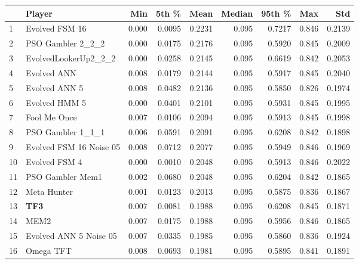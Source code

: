 \begin{tabular}{llrrrrrrr}
\toprule
{} &                   Player &    Min &   5th \% &    Mean &  Median &  95th \% &    Max &     Std \\
\midrule
1  &           Evolved FSM 16 &  0.000 &  0.0095 &  0.2231 &   0.095 &  0.7217 &  0.846 &  0.2139 \\
2  &        PSO Gambler 2\_2\_2 &  0.000 &  0.0175 &  0.2176 &   0.095 &  0.5920 &  0.845 &  0.2009 \\
3  &     EvolvedLookerUp2\_2\_2 &  0.000 &  0.0258 &  0.2145 &   0.095 &  0.6619 &  0.842 &  0.2053 \\
4  &              Evolved ANN &  0.008 &  0.0179 &  0.2144 &   0.095 &  0.5917 &  0.845 &  0.2040 \\
5  &            Evolved ANN 5 &  0.008 &  0.0482 &  0.2136 &   0.095 &  0.5850 &  0.826 &  0.1974 \\
6  &            Evolved HMM 5 &  0.000 &  0.0401 &  0.2101 &   0.095 &  0.5931 &  0.845 &  0.1995 \\
7  &             Fool Me Once &  0.007 &  0.0106 &  0.2094 &   0.095 &  0.5913 &  0.845 &  0.1998 \\
8  &        PSO Gambler 1\_1\_1 &  0.006 &  0.0591 &  0.2091 &   0.095 &  0.6208 &  0.842 &  0.1898 \\
9  &  Evolved FSM 16 Noise 05 &  0.008 &  0.0712 &  0.2077 &   0.095 &  0.5949 &  0.846 &  0.1969 \\
10 &            Evolved FSM 4 &  0.000 &  0.0010 &  0.2048 &   0.095 &  0.5913 &  0.846 &  0.2022 \\
11 &         PSO Gambler Mem1 &  0.002 &  0.0680 &  0.2048 &   0.095 &  0.6204 &  0.842 &  0.1865 \\
12 &              Meta Hunter &  0.001 &  0.0123 &  0.2013 &   0.095 &  0.5875 &  0.836 &  0.1867 \\
13 &                      \textbf{TF3} &  0.007 &  0.0081 &  0.1988 &   0.095 &  0.6208 &  0.845 &  0.1871 \\
14 &                     MEM2 &  0.007 &  0.0175 &  0.1988 &   0.095 &  0.5956 &  0.846 &  0.1865 \\
15 &   Evolved ANN 5 Noise 05 &  0.007 &  0.0335 &  0.1985 &   0.095 &  0.5860 &  0.836 &  0.1924 \\
16 &                Omega TFT &  0.008 &  0.0693 &  0.1981 &   0.095 &  0.5895 &  0.841 &  0.1891 \\
\bottomrule
\end{tabular}
